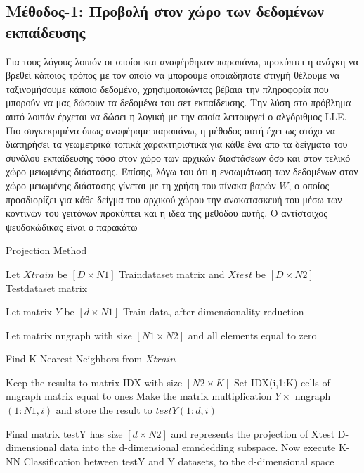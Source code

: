 \subsection{Μέθοδος-1: Προβολή στον χώρο των δεδομένων εκπαίδευσης}
\par
Για τους λόγους λοιπόν οι οποίοι και αναφέρθηκαν παραπάνω, προκύπτει η ανάγκη να βρεθεί κάποιος τρόπος με τον οποίο να μπορούμε οποιαδήποτε στιγμή θέλουμε να ταξινομήσουμε κάποιο δεδομένο, χρησιμοποιώντας βέβαια την πληροφορία που μπορούν να μας δώσουν τα δεδομένα του σετ εκπαίδευσης. Την λύση στο πρόβλημα αυτό λοιπόν έρχεται να δώσει η λογική με την οποία λειτουργεί ο αλγόριθμος \textlatin{LLE}. Πιο συγκεκριμένα όπως αναφέραμε παραπάνω, η μέθοδος αυτή έχει ως στόχο να διατηρήσει τα γεωμετρικά τοπικά χαρακτηριστικά για κάθε ένα απο τα δείγματα του συνόλου εκπαίδευσης τόσο στον χώρο των αρχικών διαστάσεων όσο και στον τελικό χώρο μειωμένης διάστασης. Επίσης, λόγω του ότι η ενσωμάτωση των δεδομένων στον χώρο μειωμένης διάστασης γίνεται με τη χρήση του πίνακα βαρών $W$, ο οποίος προσδιορίζει για κάθε δείγμα του αρχικού χώρου την ανακατασκευή του μέσω των κοντινών του γειτόνων προκύπτει και η ιδέα της μεθόδου αυτής. Ο αντίστοιχος ψευδοκώδικας είναι ο παρακάτω
\begin{algorithm}
   \caption{Projection Method}
    \begin{algorithmic}[1]   	
    	\State Let $Xtrain$ be $[D \times N1]$ Train\textunderscore dataset matrix and $Xtest$ be $[D \times N2]$ Test\textunderscore dataset matrix 
		\State 
    	
    	\State Let matrix $Y$ be $[d \times N1]$ Train data, after dimensionality reduction 
    	\State
    	
    	\State Let matrix nn\textunderscore graph with size $[N1 \times N2]$ and all elements equal to zero
    	\State 
        
            \State Find K-Nearest Neighbors from $Xtrain$
        \EndFor
        \State
		
		\State Keep the results to matrix IDX with size $[N2 \times K]$ 
            \State Set IDX(i,1:K) cells of nn\textunderscore graph matrix equal to ones
            \State Make the matrix multiplication $Y \times$ nn\textunderscore graph$(1:N1,i)$ and store the result to $testY(1:d,i)$ 
        \EndFor
        \State 
        
        \State Final matrix testY has size $[d \times N2]$ and represents the projection of Xtest D-dimensional data into the d-dimensional emndedding subspace.  
        \State
        \State Now execute K-NN Classification between testY and Y datasets, to the d-dimensional space
	\end{algorithmic}
\end{algorithm}
